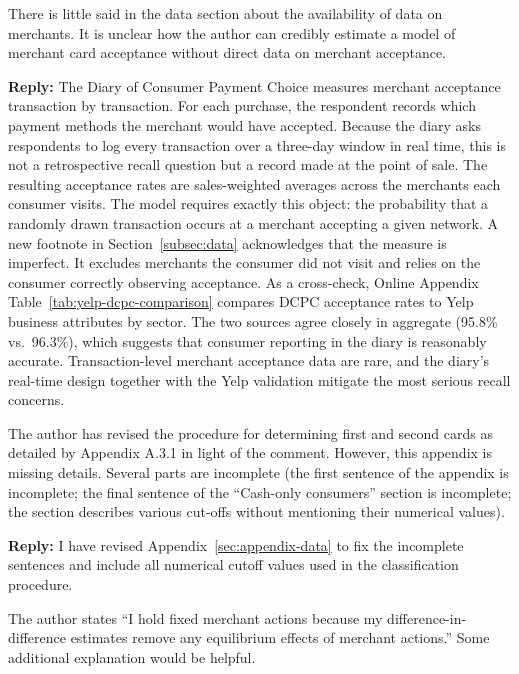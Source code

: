 \documentclass[main.tex]{subfiles}
\begin{document}
\begin{refsection}
\begin{refcommentnoclear}
There is little said in the data section about the availability of data on merchants.
It is unclear how the author can credibly estimate a model of merchant card acceptance without direct data on merchant acceptance.
\end{refcommentnoclear}

\textbf{Reply:} The Diary of Consumer Payment Choice measures merchant acceptance transaction by transaction.
For each purchase, the respondent records which payment methods the merchant would have accepted.
Because the diary asks respondents to log every transaction over a three-day window in real time, this is not a retrospective recall question but a record made at the point of sale.
The resulting acceptance rates are sales-weighted averages across the merchants each consumer visits.
The model requires exactly this object: the probability that a randomly drawn transaction occurs at a merchant accepting a given network.
A new footnote in Section~\ref{subsec:data} acknowledges that the measure is imperfect.
It excludes merchants the consumer did not visit and relies on the consumer correctly observing acceptance.
As a cross-check, Online Appendix Table~\ref{tab:yelp-dcpc-comparison} compares DCPC acceptance rates to Yelp business attributes by sector.
The two sources agree closely in aggregate (95.8\% vs.\ 96.3\%), which suggests that consumer reporting in the diary is reasonably accurate.
Transaction-level merchant acceptance data are rare, and the diary's real-time design together with the Yelp validation mitigate the most serious recall concerns.

\begin{refcommentnoclear}
The author has revised the procedure for determining first and second cards as detailed by Appendix A.3.1 in light of the comment.
However, this appendix is missing details.
Several parts are incomplete (the first sentence of the appendix is incomplete; the final sentence of the ``Cash-only consumers'' section is incomplete; the section describes various cut-offs without mentioning their numerical values).
\end{refcommentnoclear}

\textbf{Reply:} I have revised Appendix~\ref{sec:appendix-data} to fix the incomplete sentences and include all numerical cutoff values used in the classification procedure.

\begin{refcommentnoclear}
\sloppy The author states ``I hold fixed merchant actions because my difference-in-difference estimates remove any equilibrium effects of merchant actions.'' Some additional explanation would be helpful.


\end{refcommentnoclear}
\end{refsection}
\end{document}
